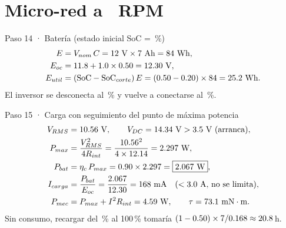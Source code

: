 \documentclass[11pt]{article}
\begin{document}
\section{Micro-red a \ValRpmMicrored\ RPM}
\begin{paso}{Paso 14 · Batería (estado inicial SoC = \ValSocInicial\,\%)}
\begin{align*}
  E&=V_{nom}\,C=\ValBateriaTension\ \text{V}\times\ValBateriaCapacidad\ \text{Ah}=\ValBateriaEnergia\ \text{Wh},\\
  E_{oc}&=\ValBateriaVacia+\ValBateriaPendiente\times0.\ValSocInicial=\ValTensionOcRef\ \text{V},\\
  E_{util}&=(\text{SoC}-\text{SoC}_{corte})\,E=(0.\ValSocInicial-0.\ValSocCorte)\times\ValBateriaEnergia=\ValEnergiaUtilRef\ \text{Wh}.
\end{align*}
El inversor se desconecta al \ValSocCorte\,\% y vuelve a conectarse al \ValSocReconexion\,\%.
\end{paso}

\begin{paso}{Paso 15 · Carga con seguimiento del punto de máxima potencia}
\begin{align*}
  V_{RMS}&=\ValFemRmsMicrored\ \text{V},\qquad V_{DC}=\ValTensionDcMicrored\ \text{V}>\ValControladorArranque\ \text{V (arranca)},\\
  P_{max}&=\frac{V_{RMS}^2}{4R_{int}}=\frac{\ValFemRmsMicrored^2}{4\times\ValResistenciaInterna}=\ValPotenciaExtraibleMicrored\ \text{W},\\
  P_{bat}&=\eta_c\,P_{max}=0.\ValControladorEficiencia\times\ValPotenciaExtraibleMicrored=\boxed{\ValPotenciaHaciaBateria\ \text{W}},\\
  I_{carga}&=\frac{P_{bat}}{E_{oc}}=\frac{\ValPotenciaHaciaBateria}{\ValTensionOcRef}=\ValCorrienteCargaMicroredMili\ \text{mA}
  \quad(<\ValControladorCorrienteMax\ \text{A, no se limita}),\\
  P_{mec}&=P_{max}+I^2R_{int}=\ValPotenciaMecanicaMicrored\ \text{W},\qquad
  \tau=\ValParMicroredMili\ \text{mN}\cdot\text{m}.
\end{align*}
Sin consumo, recargar del \ValSocInicial\,\% al 100\,\% tomaría
$(1-0.50)\times7/0.168\approx20.8$\,h.
\end{paso}
\end{document}
